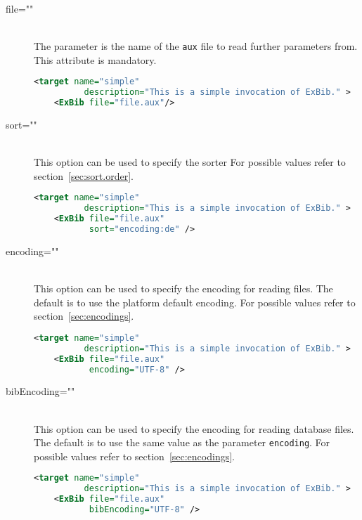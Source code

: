 \begin{description}
\item[file=""] \ \\
  The parameter is the name of the \texttt{aux} file to read further
  parameters from. This attribute is mandatory.

\begin{lstlisting}[language=XML,morekeywords={target}]
  <target name="simple"
          description="This is a simple invocation of ExBib." >
    <ExBib file="file.aux"/>
\end{lstlisting}

\item[sort=""] \ \\
  This option can be used to specify the sorter For possible
  values refer to section~\ref{sec:sort.order}.

\begin{lstlisting}[language=XML,morekeywords={target}]
  <target name="simple"
          description="This is a simple invocation of ExBib." >
    <ExBib file="file.aux"
           sort="encoding:de" />
\end{lstlisting}

\item[encoding=""] \ \\
  This option can be used to specify the encoding for reading files.
  The default is to use the platform default encoding. For possible
  values refer to section~\ref{sec:encodings}.

\begin{lstlisting}[language=XML,morekeywords={target}]
  <target name="simple"
          description="This is a simple invocation of ExBib." >
    <ExBib file="file.aux"
           encoding="UTF-8" />
\end{lstlisting}

\item[bibEncoding=""] \ \\
  This option can be used to specify the encoding for reading database
  files. The default is to use the same value as the parameter
  \texttt{encoding}.  For possible values refer to
  section~\ref{sec:encodings}.

\begin{lstlisting}[language=XML,morekeywords={target}]
  <target name="simple"
          description="This is a simple invocation of ExBib." >
    <ExBib file="file.aux"
           bibEncoding="UTF-8" />
\end{lstlisting}


\end{description}
